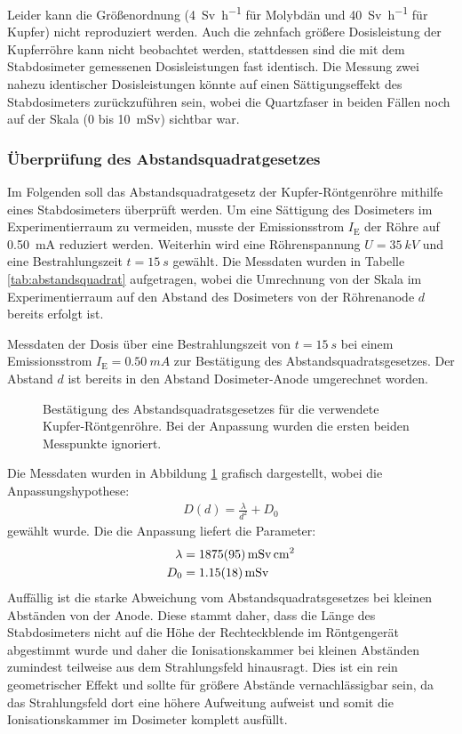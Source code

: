\documentclass[11pt, a4paper]{article}
\numberwithin{equation}{section}
\begin{document}
Leider kann die Größenordnung (\SI{4}{\sievert\per\hour} für Molybdän und \SI{40}{\sievert\per\hour} für Kupfer) nicht reproduziert werden.
Auch die zehnfach größere Dosisleistung der Kupferröhre kann nicht beobachtet werden, stattdessen sind die mit dem Stabdosimeter gemessenen Dosisleistungen fast identisch.
Die Messung zwei nahezu identischer Dosisleistungen könnte auf einen Sättigungseffekt des Stabdosimeters zurückzuführen sein, wobei die Quartzfaser in beiden Fällen noch auf der Skala (0 bis \SI{10}{mSv}) sichtbar war.

\subsubsection{Überprüfung des Abstandsquadratgesetzes}
Im Folgenden soll das Abstandsquadratgesetz der Kupfer-Röntgenröhre mithilfe eines Stabdosimeters überprüft werden.
Um eine Sättigung des Dosimeters im Experimentierraum zu vermeiden, musste der Emissionsstrom $I_\mathrm{E}$ der Röhre auf \SI{0.50}{mA} reduziert werden.
Weiterhin wird eine Röhrenspannung $U = \SI{35}{kV}$ und eine Bestrahlungszeit $t = \SI{15}{s}$ gewählt.
Die Messdaten wurden in Tabelle \ref{tab:abstandsquadrat} aufgetragen, wobei die Umrechnung von der Skala im Experimentierraum auf den Abstand des Dosimeters von der Röhrenanode $d$ bereits erfolgt ist.
\begin{table}[ht]
	\centering
	
	\caption{Messdaten der Dosis über eine Bestrahlungszeit von $t=\SI{15}{s}$ bei einem Emissionsstrom $I_\mathrm{E} = \SI{0.50}{mA}$ zur Bestätigung des Abstandsquadratsgesetzes. Der Abstand $d$ ist bereits in den Abstand Dosimeter-Anode umgerechnet worden.}
	\label{tab:abstandsquadrat}
\end{table}
\begin{figure}[ht]
	\centering
	
	\caption{Bestätigung des Abstandsquadratsgesetzes für die verwendete Kupfer-Röntgenröhre. Bei der Anpassung wurden die ersten beiden Messpunkte ignoriert.}
	\label{fig:abstandsquadrat}
\end{figure}
Die Messdaten wurden in Abbildung \ref{fig:abstandsquadrat} grafisch dargestellt, wobei die Anpassungshypothese:
\begin{align}
	D(d) = \frac{\lambda}{d^2} + D_0
\end{align}
gewählt wurde.
Die die Anpassung liefert die Parameter:
\begin{align*}
	\lambda &= \SI{1875 +- 95}{\milli\sievert\centi\metre\squared}\\
	D_0 &= \SI{1.15 +- 0.18}{\milli\sievert}
\end{align*}
Auffällig ist die starke Abweichung vom Abstandsquadratsgesetzes bei kleinen Abständen von der Anode.
Diese stammt daher, dass die Länge des Stabdosimeters nicht auf die Höhe der Rechteckblende im Röntgengerät abgestimmt wurde und daher die Ionisationskammer bei kleinen Abständen zumindest teilweise aus dem Strahlungsfeld hinausragt.
Dies ist ein rein geometrischer Effekt und sollte für größere Abstände vernachlässigbar sein, da das Strahlungsfeld dort eine höhere Aufweitung aufweist und somit die Ionisationskammer im Dosimeter komplett ausfüllt.
\end{document}
